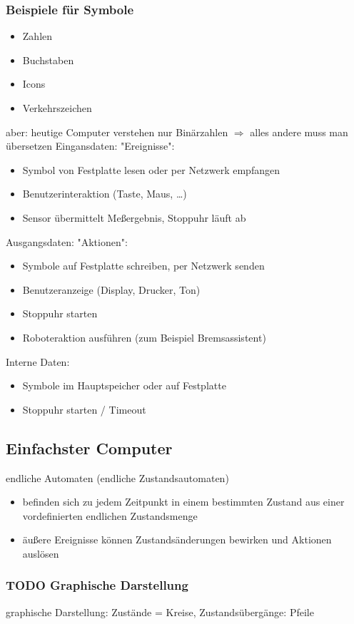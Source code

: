 \documentclass[a4paper]{scrartcl}
\begin{document}
\subsubsection{Beispiele für Symbole}
\label{sec-4-2-1}
\begin{itemize}
\item Zahlen
\item Buchstaben
\item Icons
\item Verkehrszeichen
\end{itemize}
aber: heutige Computer verstehen nur Binärzahlen $\Rightarrow$ alles andere muss man übersetzen
Eingansdaten: "Ereignisse":
\begin{itemize}
\item Symbol von Festplatte lesen oder per Netzwerk empfangen
\item Benutzerinteraktion (Taste, Maus, \ldots{})
\item Sensor übermittelt Meßergebnis, Stoppuhr läuft ab
\end{itemize}
Ausgangsdaten: "Aktionen":
\begin{itemize}
\item Symbole auf Festplatte schreiben, per Netzwerk senden
\item Benutzeranzeige (Display, Drucker, Ton)
\item Stoppuhr starten
\item Roboteraktion ausführen (zum Beispiel Bremsassistent)
\end{itemize}
Interne Daten:
\begin{itemize}
\item Symbole im Hauptspeicher oder auf Festplatte
\item Stoppuhr starten / Timeout
\end{itemize}
\subsection{Einfachster Computer}
\label{sec-4-3}
endliche Automaten (endliche Zustandsautomaten)
\begin{itemize}
\item befinden sich zu jedem Zeitpunkt in einem bestimmten Zustand aus einer vordefinierten endlichen Zustandsmenge
\item äußere Ereignisse können Zustandsänderungen bewirken und Aktionen auslösen
\end{itemize}
\subsubsection{{\bfseries\sffamily TODO} Graphische Darstellung}
\label{sec-4-3-1}
graphische Darstellung: Zustände = Kreise, Zustandsübergänge: Pfeile
\end{document}
